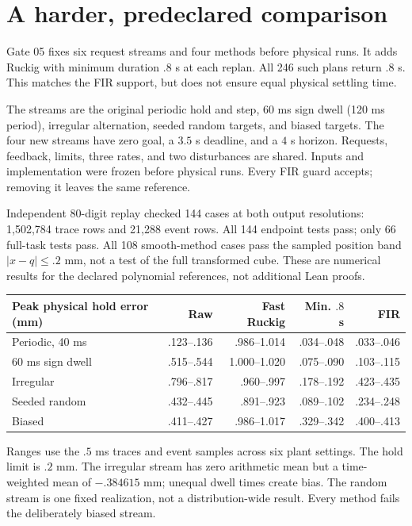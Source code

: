 \section{A harder, predeclared comparison}
Gate 05 fixes six request streams and four methods before physical runs. It adds Ruckig with minimum duration $.8$ s at each replan. All 246 such plans return $.8$ s. This matches the FIR support, but does not ensure equal physical settling time.

The streams are the original periodic hold and step, 60 ms sign dwell (120 ms period), irregular alternation, seeded random targets, and biased targets. The four new streams have zero goal, a $3.5$ s deadline, and a $4$ s horizon. Requests, feedback, limits, three rates, and two disturbances are shared. Inputs and implementation were frozen before physical runs. Every FIR guard accepts; removing it leaves the same reference.

Independent 80-digit replay checked 144 cases at both output resolutions: 1,502,784 trace rows and 21,288 event rows. All 144 endpoint tests pass; only 66 full-task tests pass. All 108 smooth-method cases pass the sampled position band $|x-q|\leq.2$ mm, not a test of the full transformed cube. These are numerical results for the declared polynomial references, not additional Lean proofs.

\begin{center}\small
\begin{tabular}{lrrrr}
\toprule
Peak physical hold error (mm) & Raw & Fast Ruckig & Min. $.8$ s & FIR\\
\midrule
Periodic, 40 ms & .123--.136 & .986--1.014 & .034--.048 & .033--.046\\
60 ms sign dwell & .515--.544 & 1.000--1.020 & .075--.090 & .103--.115\\
Irregular & .796--.817 & .960--.997 & .178--.192 & .423--.435\\
Seeded random & .432--.445 & .891--.923 & .089--.102 & .234--.248\\
Biased & .411--.427 & .986--1.017 & .329--.342 & .400--.413\\
\bottomrule
\end{tabular}
\end{center}
Ranges use the $.5$ ms traces and event samples across six plant settings. The hold limit is $.2$ mm. The irregular stream has zero arithmetic mean but a time-weighted mean of $-.384615$ mm; unequal dwell times create bias. The random stream is one fixed realization, not a distribution-wide result. Every method fails the deliberately biased stream.

